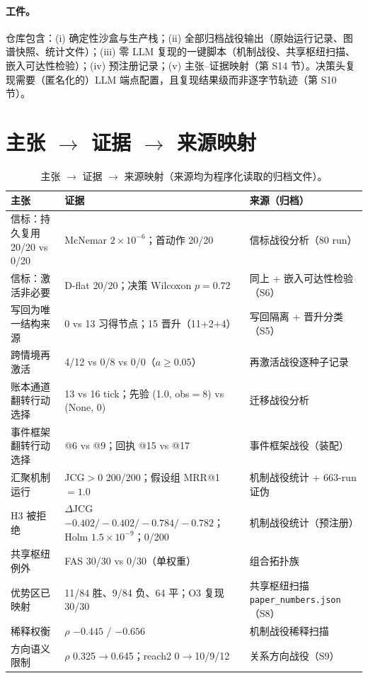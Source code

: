 \documentclass[10pt,a4paper]{ctexart}
\begin{document}
\paragraph{工件。}仓库包含：(i) 确定性沙盒与生产栈；(ii) 全部归档战役输出（原始运行记录、图谱快照、统计文件）；(iii) 零 LLM 复现的一键脚本（机制战役、共享枢纽扫描、嵌入可达性检验）；(iv) 预注册记录；(v) 主张--证据映射（第 S14 节）。决策头复现需要（匿名化的）LLM 端点配置，且复现结果级而非逐字节轨迹（第 S10 节）。

\section{主张 $\rightarrow$ 证据 $\rightarrow$ 来源映射}
\label{s14:claims}

\begin{table}[h]
\centering\small
\caption{主张 $\rightarrow$ 证据 $\rightarrow$ 来源映射（来源均为程序化读取的归档文件）。}
\label{tab:s-claims}
\begin{tabular}{L{4.6cm}L{4.6cm}L{5.6cm}}
\toprule
\textbf{主张} & \textbf{证据} & \textbf{来源（归档）} \\
\midrule
信标：持久复用 20/20 vs 0/20 & McNemar $2\times10^{-6}$；首动作 20/20 & 信标战役分析（80 run） \\
信标：激活非必要 & D-flat 20/20；决策 Wilcoxon $p{=}0.72$ & 同上 + 嵌入可达性检验（S6） \\
写回为唯一结构来源 & 0 vs 13 习得节点；15 晋升（11+2+4） & 写回隔离 + 晋升分类（S5） \\
跨情境再激活 & 4/12 vs 0/8 vs 0/0（$a\ge0.05$） & 再激活战役逐种子记录 \\
账本通道翻转行动选择 & 13 vs 16 tick；先验 (1.0, obs$=$8) vs (None, 0) & 迁移战役分析 \\
事件框架翻转行动选择 & @6 vs @9；回执 @15 vs @17 & 事件框架战役（装配） \\
汇聚机制运行 & JCG$>0$ 200/200；假设组 MRR@1$=1.0$ & 机制战役统计 + 663-run 证伪 \\
H3 被拒绝 & $\Delta$JCG $-0.402/-0.402/-0.784/-0.782$；Holm $1.5\times10^{-9}$；0/200 & 机制战役统计（预注册） \\
共享枢纽例外 & FAS 30/30 vs 0/30（单权重） & 组合拓扑族 \\
优势区已映射 & 11/84 胜、9/84 负、64 平；O3 复现 30/30 & 共享枢纽扫描 \texttt{paper\_numbers.json}（S8） \\
稀释权衡 & $\rho$ $-0.445$ / $-0.656$ & 机制战役稀释扫描 \\
方向语义限制 & $\rho$ 0.325$\rightarrow$0.645；reach2 0$\rightarrow$10/9/12 & 关系方向战役（S9） \\

\end{tabular}
\end{table}
\end{document}
